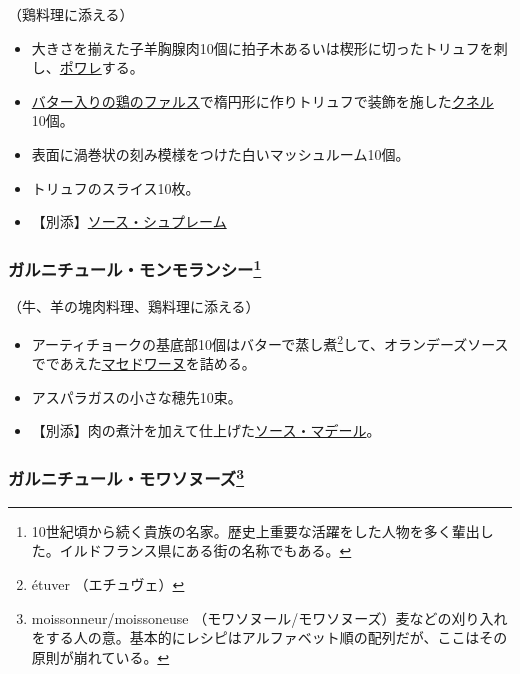 \begin{recette}
（鶏料理に添える）

\begin{itemize}
\item
  大きさを揃えた子羊胸腺肉10個に拍子木あるいは楔形に切ったトリュフを刺し、\protect\hyperlink{les-poeles}{ポワレ}する。
\item
  \protect\hyperlink{farce-b}{バター入りの鶏のファルス}で楕円形に作りトリュフで装飾を施した\protect\hyperlink{quenelles-diverses}{クネル}
  10個。
\item
  表面に渦巻状の刻み模様をつけた白いマッシュルーム10個。
\item
  トリュフのスライス10枚。
\item
  【別添】\protect\hyperlink{sauce-supreme}{ソース・シュプレーム}
\end{itemize}

\atoaki{}

\hypertarget{garniture-montmorency}{%
\subsubsection[ガルニチュール・モンモランシー]{\texorpdfstring{ガルニチュール・モンモランシー\footnote{10世紀頃から続く貴族の名家。歴史上重要な活躍をした人物を多く輩出した。イルドフランス県にある街の名称でもある。}}{ガルニチュール・モンモランシー}}\label{garniture-montmorency}}



（牛、羊の塊肉料理、鶏料理に添える）

\begin{itemize}
\item
  アーティチョークの基底部10個はバターで蒸し煮\footnote{étuver
    （エチュヴェ）}して、オランデーズソースでであえた\protect\hyperlink{garniture-macedoine}{マセドワーヌ}を詰める。
\item
  アスパラガスの小さな穂先10束。
\item
  【別添】肉の煮汁を加えて仕上げた\protect\hyperlink{sauce-madere}{ソース・マデール}。
\end{itemize}

\atoaki{}

\hypertarget{garniture-moissonneuse}{%
\subsubsection[ガルニチュール・モワソヌーズ]{\texorpdfstring{ガルニチュール・モワソヌーズ\footnote{moissonneur/moissoneuse
  （モワソヌール/モワソヌーズ）麦などの刈り入れをする人の意。基本的にレシピはアルファベット順の配列だが、ここはその原則が崩れている。}}{ガルニチュール・モワソヌーズ}}\label{garniture-moissonneuse}}


\end{recette}
